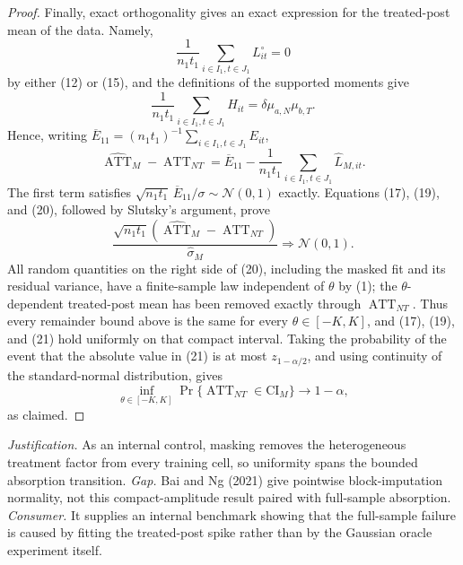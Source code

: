\documentclass{article}
\begin{document}
\begin{proof}
Finally, exact orthogonality gives an exact expression for the treated-post mean of the data.  Namely,
\[
 \frac1{n_1t_1}\sum_{i\in I_1,t\in J_1}L^\circ_{it}=0
\]
by either (12) or (15), and the definitions of the supported moments give
\[
 \frac1{n_1t_1}\sum_{i\in I_1,t\in J_1}H_{it}
 =\delta\mu_{a,N}\mu_{b,T}.
\]
Hence, writing \(\overline E_{11}=(n_1t_1)^{-1}\sum_{i\in I_1,t\in J_1}E_{it}\),
\[
 \widehat{\operatorname{ATT}}_M-\operatorname{ATT}_{NT}
 =\overline E_{11}
 -\frac1{n_1t_1}\sum_{i\in I_1,t\in J_1}\widehat L_{M,it}.
\tag{20}
\]
The first term satisfies \(\sqrt{n_1t_1}\,\overline E_{11}/\sigma\sim\mathcal N(0,1)\) exactly.  Equations (17), (19), and (20), followed by Slutsky's argument, prove
\[
 \frac{\sqrt{n_1t_1}(\widehat{\operatorname{ATT}}_M-\operatorname{ATT}_{NT})}{\widehat\sigma_M}
 \Rightarrow\mathcal N(0,1).
\tag{21}
\]
All random quantities on the right side of (20), including the masked fit and its residual variance, have a finite-sample law independent of \(\theta\) by (1); the \(\theta\)-dependent treated-post mean has been removed exactly through \(\operatorname{ATT}_{NT}\).  Thus every remainder bound above is the same for every \(\theta\in[-K,K]\), and (17), (19), and (21) hold uniformly on that compact interval.  Taking the probability of the event that the absolute value in (21) is at most \(z_{1-\alpha/2}\), and using continuity of the standard-normal distribution, gives
\[
 \inf_{\theta\in[-K,K]}
 \Pr\{\operatorname{ATT}_{NT}\in\mathrm{CI}_M\}\longrightarrow1-\alpha,
\]
as claimed.
\end{proof}
\par\smallskip\noindent \textit{Justification.} As an internal control, masking removes the heterogeneous treatment factor from every training cell, so uniformity spans the bounded absorption transition. \textit{Gap.} Bai and Ng (2021) give pointwise block-imputation normality, not this compact-amplitude result paired with full-sample absorption. \textit{Consumer.} It supplies an internal benchmark showing that the full-sample failure is caused by fitting the treated-post spike rather than by the Gaussian oracle experiment itself.
\end{document}
